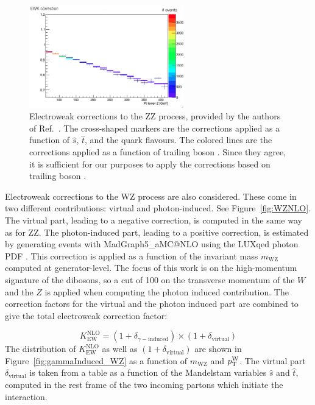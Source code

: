 \begin{figure}[!thbp]
\centering
\includegraphics[width=0.60\textwidth]{figures/ZZ_ewkCorr.png}
\caption{Electroweak corrections to the ZZ process, provided by the authors of Ref.~\cite{Bierweiler:2013dja}.
The cross-shaped markers are the corrections applied as a function of $\hat{s}$, $\hat{t}$, and the quark flavours.
The colored lines are the corrections applied as a function of trailing boson \pt.
Since they agree, it is sufficient for our purposes to apply the corrections based on trailing boson \pt.}
\label{fig:ewkCorrectionCompare}
\end{figure}

Electroweak corrections to the WZ process are also considered. 
These come in two different contributions: virtual and photon-induced. See Figure~\ref{fig:WZNLO}. 
The virtual part, leading to a negative correction, is computed in the same way as for ZZ. 
The photon-induced part, leading to a positive correction, 
is estimated by generating events with MadGraph5\_aMC@NLO 
using the LUXqed photon PDF \cite{Manohar:2016nzj}.
This correction is applied as a function of the invariant mass $m_\mathrm{WZ}$ computed at generator-level.
The focus of this work is on the high-momentum signature of the dibosons,
so a cut of 100 \GeV on the transverse momentum of the $W$ and the $Z$ is applied
when computing the photon induced contribution.
The correction factors for the virtual and the photon induced part are combined to give the total electroweak correction factor:

\begin{equation}
K^\mathrm{NLO}_\mathrm{EW} = (1 + \delta_{\gamma - \mathrm{induced}}) \times (1 + \delta_\mathrm{virtual})
\end{equation}
The distribution of $K^\mathrm{NLO}_\mathrm{EW}$ as well as $(1 + \delta_\mathrm{virtual})$ are shown
in Figure~\ref{fig:gammaInduced_WZ} as a function of $m_\mathrm{WZ}$ and $p_\mathrm{T}^{\mathrm{W}}$.
The virtual part $\delta_\mathrm{virtual}$ is taken from a table as a function of the Mandelstam variables $\hat{s}$ and $\hat{t}$, computed in the rest frame of the two incoming partons which initiate the interaction.
\clearpage

